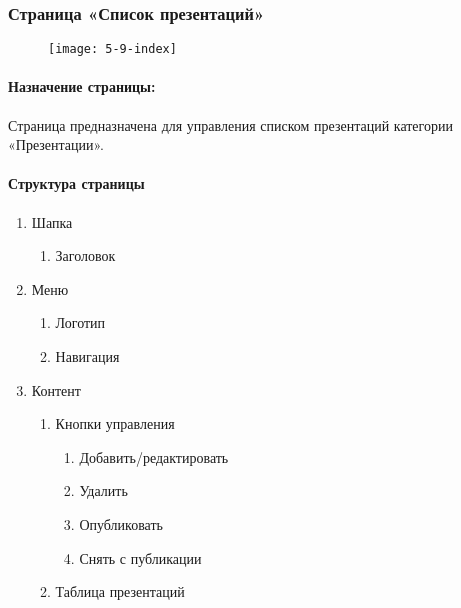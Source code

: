 \subsubsection{Страница «Список презентаций»}
\begin{figure}[H]
	\texttt{[image: 5-9-index]}
\end{figure}
\paragraph{Назначение страницы:} Страница предназначена для управления списком презентаций категории «Презентации».

\paragraph{Структура страницы}
\begin{enumerate}
	\item Шапка
	\begin{enumerate}
		\item Заголовок
	\end{enumerate}

	\item Меню
	\begin{enumerate}
		\item Логотип
		\item Навигация
	\end{enumerate}

	\item Контент
	\begin{enumerate}
		\item Кнопки управления
		\begin{enumerate}
			\item Добавить/редактировать
			\item Удалить
			\item Опубликовать
			\item Снять с публикации
		\end{enumerate}
		\item Таблица презентаций
	\end{enumerate}
\end{enumerate}

